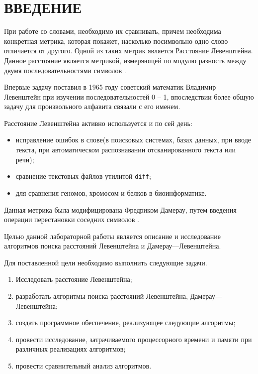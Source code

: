 \chapter*{\hfill{\centering  ВВЕДЕНИЕ}\hfill}


При работе со словами, необходимо их сравнивать, причем необходима конкретная метрика, которая покажет, насколько посимвольно одно слово отличается от другого.
Одной из таких метрик является Расстояние Левенштейна.
Данное расстояние является метрикой, измеряющей по модулю разность между двумя последовательностями символов \cite{levenshtein}. 

Впервые задачу поставил в 1965 году советский математик Владимир Левенштейн при изучении последовательностей 0 -- 1, впоследствии более общую задачу для произвольного алфавита связали с его именем.

Расстояние Левенштейна активно используется и по сей день:
\begin{itemize}[label=---]
	\item исправление ошибок в слове(в поисковых системах, базах данных, при вводе текста, при автоматическом распознавании отсканированного текста или речи);
	\item сравнение текстовых файлов утилитой \texttt{diff};
	\item для сравнения геномов, хромосом и белков в биоинформатике.
\end{itemize}

Данная метрика была модифицирована Фредриком Дамерау, путем введения операции перестановки соседних символов \cite{Damerau}.

\label{sec:targets}
Целью данной лабораторной работы является описание и исследование алгоритмов поиска расстояний Левенштейна и Дамерау---Левенштейна.


Для поставленной цели необходимо выполнить следующие задачи.
\begin{enumerate}
	\item Исследовать расстояние Левенштейна;
	\item разработать алгоритмы поиска расстояний Левенштейна, Дамерау---Левенштейна;
	\item создать программное обеспечение, реализующее следующие алгоритмы;
	\item провести исследование, затрачиваемого процессорного времени и памяти при различных реализациях алгоритмов;
	\item провести сравнительный анализ алгоритмов.
\end{enumerate}



